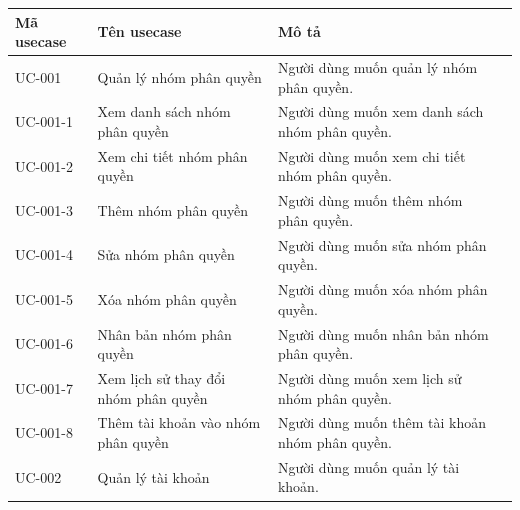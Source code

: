\documentclass[12pt,a4paper]{article}
\begin{document}
    \begin{center}
        \begin{longtable}{|p{2.5cm}|p{4.5cm}|p{7.5cm}|c|}
            \hline
            \centering \textbf{Mã usecase} & \centering \textbf{Tên usecase} & \textbf{Mô tả}
            \\ \hline
            \endhead
            UC-001
            & Quản lý nhóm phân quyền
            & Người dùng muốn quản lý nhóm phân quyền.
            \\ \hline
            UC-001-1
            & Xem danh sách nhóm phân quyền
            & Người dùng muốn xem danh sách nhóm phân quyền.
            \\ \hline
            UC-001-2
            & Xem chi tiết nhóm phân quyền
            & Người dùng muốn xem chi tiết nhóm phân quyền.
            \\ \hline
            UC-001-3
            & Thêm nhóm phân quyền
            & Người dùng muốn thêm nhóm phân quyền.
            \\ \hline
            UC-001-4
            & Sửa nhóm phân quyền
            & Người dùng muốn sửa nhóm phân quyền.
            \\ \hline
            UC-001-5
            & Xóa nhóm phân quyền
            & Người dùng muốn xóa nhóm phân quyền.
            \\ \hline
            UC-001-6
            & Nhân bản nhóm phân quyền
            & Người dùng muốn nhân bản nhóm phân quyền.
            \\ \hline
            UC-001-7
            & Xem lịch sử thay đổi nhóm phân quyền
            & Người dùng muốn xem lịch sử nhóm phân quyền.
            \\ \hline
            UC-001-8
            & Thêm tài khoản vào nhóm phân quyền
            & Người dùng muốn thêm tài khoản nhóm phân quyền.
            \\ \hline
            UC-002
            & Quản lý tài khoản
            & Người dùng muốn quản lý tài khoản.
            \\ \hline


\end{longtable}
\end{center}
\end{document}
